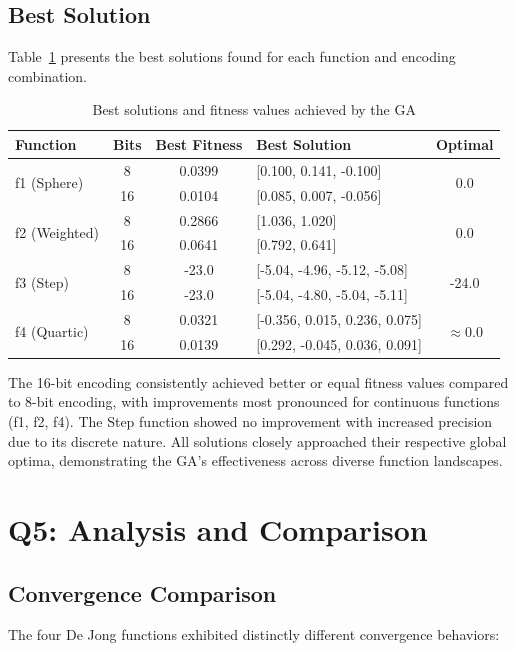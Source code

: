 \documentclass[journal,12pt,onecolumn]{IEEEtran}
\begin{document}
\subsection{Best Solution}
Table~\ref{tab:best_solutions} presents the best solutions found for each function and encoding combination.

\begin{table}[H]
\centering
\caption{Best solutions and fitness values achieved by the GA}
\label{tab:best_solutions}
\begin{tabular}{|l|c|c|l|c|}
\hline
\textbf{Function} & \textbf{Bits} & \textbf{Best Fitness} & \textbf{Best Solution} & \textbf{Optimal} \\
\hline
\multirow{2}{*}{f1 (Sphere)} & 8 & 0.0399 & [0.100, 0.141, -0.100] & \multirow{2}{*}{0.0} \\
& 16 & 0.0104 & [0.085, 0.007, -0.056] & \\
\hline
\multirow{2}{*}{f2 (Weighted)} & 8 & 0.2866 & [1.036, 1.020] & \multirow{2}{*}{0.0} \\
& 16 & 0.0641 & [0.792, 0.641] & \\
\hline
\multirow{2}{*}{f3 (Step)} & 8 & -23.0 & [-5.04, -4.96, -5.12, -5.08] & \multirow{2}{*}{-24.0} \\
& 16 & -23.0 & [-5.04, -4.80, -5.04, -5.11] & \\
\hline
\multirow{2}{*}{f4 (Quartic)} & 8 & 0.0321 & [-0.356, 0.015, 0.236, 0.075] & \multirow{2}{*}{$\approx$0.0} \\
& 16 & 0.0139 & [0.292, -0.045, 0.036, 0.091] & \\
\hline
\end{tabular}
\end{table}

The 16-bit encoding consistently achieved better or equal fitness values compared to 8-bit encoding, with improvements most pronounced for continuous functions (f1, f2, f4). The Step function showed no improvement with increased precision due to its discrete nature. All solutions closely approached their respective global optima, demonstrating the GA's effectiveness across diverse function landscapes.

\section{Q5: Analysis and Comparison}

\subsection{Convergence Comparison}
The four De Jong functions exhibited distinctly different convergence behaviors:
\end{document}
